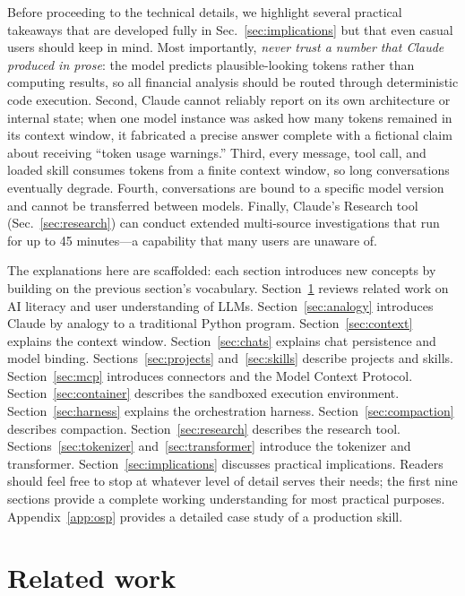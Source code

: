 \documentclass[12pt]{article}
\begin{document}
Before proceeding to the technical details, we highlight several practical takeaways that are developed fully in Sec.~\ref{sec:implications} but that even casual users should keep in mind. Most importantly, \emph{never trust a number that Claude produced in prose}: the model predicts plausible-looking tokens rather than computing results, so all financial analysis should be routed through deterministic code execution. Second, Claude cannot reliably report on its own architecture or internal state; when one model instance was asked how many tokens remained in its context window, it fabricated a precise answer complete with a fictional claim about receiving ``token usage warnings.'' Third, every message, tool call, and loaded skill consumes tokens from a finite context window, so long conversations eventually degrade. Fourth, conversations are bound to a specific model version and cannot be transferred between models. Finally, Claude's Research tool (Sec.~\ref{sec:research}) can conduct extended multi-source investigations that run for up to 45 minutes---a capability that many users are unaware of.

The explanations here are scaffolded: each section introduces new concepts by building on the previous section's vocabulary. Section~\ref{sec:related} reviews related work on AI literacy and user understanding of LLMs. Section~\ref{sec:analogy} introduces Claude by analogy to a traditional Python program. Section~\ref{sec:context} explains the context window. Section~\ref{sec:chats} explains chat persistence and model binding. Sections~\ref{sec:projects} and~\ref{sec:skills} describe projects and skills. Section~\ref{sec:mcp} introduces connectors and the Model Context Protocol. Section~\ref{sec:container} describes the sandboxed execution environment. Section~\ref{sec:harness} explains the orchestration harness. Section~\ref{sec:compaction} describes compaction. Section~\ref{sec:research} describes the research tool. Sections~\ref{sec:tokenizer} and~\ref{sec:transformer} introduce the tokenizer and transformer. Section~\ref{sec:implications} discusses practical implications. Readers should feel free to stop at whatever level of detail serves their needs; the first nine sections provide a complete working understanding for most practical purposes. Appendix~\ref{app:osp} provides a detailed case study of a production skill.

\section{Related work}
\label{sec:related}
\end{document}
